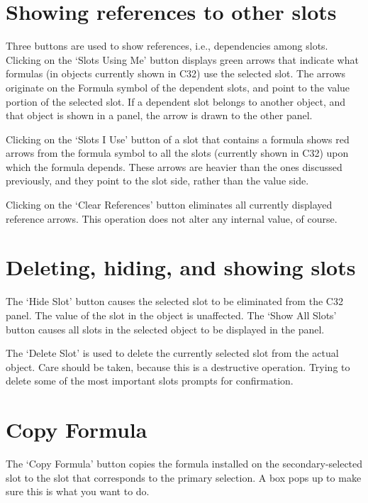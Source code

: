 \section{Showing references to other slots}

Three buttons are used to show references, i.e., dependencies among slots.
Clicking on the `Slots Using Me' button displays green arrows that
indicate what formulas (in objects currently shown in C32) use the
selected slot.  The arrows originate on the Formula symbol of the
dependent slots, and point to the value portion of the selected slot.  If
a dependent slot belongs to another object, and that object is shown in a
panel, the arrow is drawn to the other panel.

Clicking on the `Slots I Use' button of a slot that contains a formula
shows red arrows from the formula symbol to all the slots (currently shown
in C32) upon which the formula depends.  These arrows are heavier than the
ones discussed previously, and they point to the slot side, rather than
the value side.

Clicking on the `Clear References' button eliminates all currently
displayed reference arrows.  This operation does not alter any internal
value, of course.


\section{Deleting, hiding, and showing slots}

The `Hide Slot' button causes the selected slot to be eliminated from the
C32 panel.  The value of the slot in the object is unaffected.  The `Show
All Slots' button causes all slots in the selected object to be displayed
in the panel.

The `Delete Slot' is used to delete the currently selected slot from the
actual object.  Care should be taken, because this is a destructive
operation.  Trying to delete some of the most important slots prompts for
confirmation.


\section{Copy Formula}

The `Copy Formula' button copies the formula installed on the
secondary-selected slot to the slot that corresponds to the primary
selection.  A box pops up to make sure this is what you want to do.


